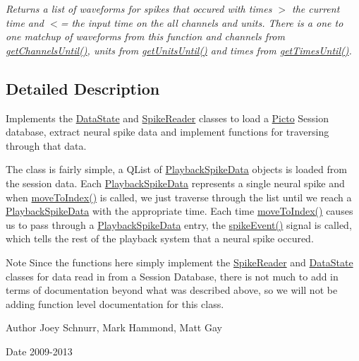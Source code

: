 \begin{DoxyCompactItemize}
\begin{DoxyCompactList}\small\item\em Returns a list of waveforms for spikes that occured with times $>$ the current time and $<$= the input time on the all channels and units. There is a one to one matchup of waveforms from this function and channels from \hyperlink{class_picto_1_1_spike_state_aaab7883be0f0a4f035a9b0c7eb567da1}{get\-Channels\-Until()}, units from \hyperlink{class_picto_1_1_spike_state_a73c82b648f2dc88b51c6b0de31b0a21a}{get\-Units\-Until()} and times from \hyperlink{class_picto_1_1_spike_state_ae132eb7cc369b9c174eac9dd38e00413}{get\-Times\-Until()}. \end{DoxyCompactList}\end{DoxyCompactItemize}


\subsection{Detailed Description}
Implements the \hyperlink{class_picto_1_1_data_state}{Data\-State} and \hyperlink{class_picto_1_1_spike_reader}{Spike\-Reader} classes to load a \hyperlink{namespace_picto}{Picto} Session database, extract neural spike data and implement functions for traversing through that data. 

The class is fairly simple, a Q\-List of \hyperlink{struct_picto_1_1_playback_spike_data}{Playback\-Spike\-Data} objects is loaded from the session data. Each \hyperlink{struct_picto_1_1_playback_spike_data}{Playback\-Spike\-Data} represents a single neural spike and when \hyperlink{class_picto_1_1_spike_state_adff36be6aba208cd131b253926a18853}{move\-To\-Index()} is called, we just traverse through the list until we reach a \hyperlink{struct_picto_1_1_playback_spike_data}{Playback\-Spike\-Data} with the appropriate time. Each time \hyperlink{class_picto_1_1_spike_state_adff36be6aba208cd131b253926a18853}{move\-To\-Index()} causes us to pass through a \hyperlink{struct_picto_1_1_playback_spike_data}{Playback\-Spike\-Data} entry, the \hyperlink{class_picto_1_1_spike_state_a87ccdb38e1f4d25fd7d74781da290e13}{spike\-Event()} signal is called, which tells the rest of the playback system that a neural spike occured.

\begin{DoxyNote}{Note}
Since the functions here simply implement the \hyperlink{class_picto_1_1_spike_reader}{Spike\-Reader} and \hyperlink{class_picto_1_1_data_state}{Data\-State} classes for data read in from a Session Database, there is not much to add in terms of documentation beyond what was described above, so we will not be adding function level documentation for this class. 
\end{DoxyNote}
\begin{DoxyAuthor}{Author}
Joey Schnurr, Mark Hammond, Matt Gay 
\end{DoxyAuthor}
\begin{DoxyDate}{Date}
2009-\/2013 
\end{DoxyDate}


